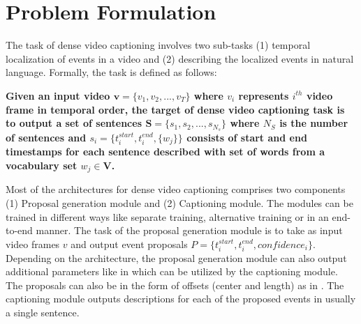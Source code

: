 \section{Problem Formulation}
\par The task of dense video captioning involves two sub-tasks (1) temporal localization of events in a video and (2) describing the localized events in natural language. 
Formally, the task is defined as follows:

\par \textbf{Given an input video $\mathbf{v} = \{v_1, v_2, ... , v_T \}$ where $v_i$ represents $i^{th}$ video frame in temporal order, the target of dense video captioning task is to output a set of sentences $\mathbf{S} = \{s_1, s_2, ... , s_{N_s}\}$ where $N_S$ is the number of sentences and $s_i = \{t_i^{start}, t_i^{end}, \{w_j\} \}$ consists of start and end timestamps for each sentence described with set of words from a vocabulary set $w_j \in \mathbf{V}$.}

\par Most of the architectures for dense video captioning comprises two components (1) Proposal generation module and (2) Captioning module. The modules can be trained in different ways like separate training, alternative training or in an end-to-end manner. The task of the proposal generation module is to take as input video frames $v$ and output event proposals $P = \{t_i^{start}, t_i^{end}, confidence_i \}$. Depending on the architecture, the proposal generation module can also output additional parameters like in \cite{krishna2017densecaptioning, li2018jointly, wang2018bidirectional} which can be utilized by the captioning module. The proposals can also be in the form of offsets (center and length) as in \cite{li2018jointly, iashin2020better, xu2018joint, deng2021sketch, zhou2018end}. The captioning module outputs descriptions for each of the proposed events in usually a single sentence.